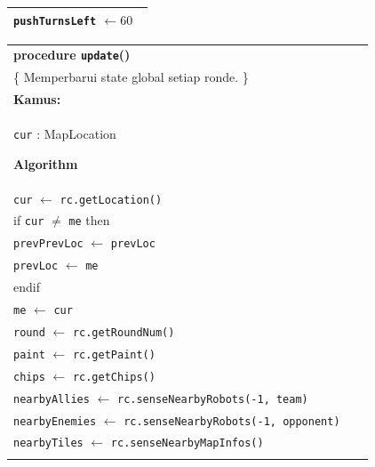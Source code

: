 \documentclass{article}
\newenvironment{pseudobox}
{
\centering
\begin{longtable}{|p{0.94\linewidth}|}
\hline
}
{
\\ \hline
\end{longtable}
\vspace{0.05cm}
}
\begin{document}
\begin{enumerate}[label=\alph*.]
\begin{enumerate}[label=\alph*.]
\begin{pseudobox}
\hspace*{1.5em}\texttt{pushTurnsLeft} $\leftarrow 60$
\end{pseudobox}

\begin{pseudobox}
\textbf{procedure \texttt{update}()} \\
\{ Memperbarui state global setiap ronde. \}\\

\textbf{Kamus:} \\
\hspace*{1.5em}\texttt{cur} : MapLocation

\textbf{Algorithm} \\
\hspace*{1.5em}\texttt{cur} $\leftarrow$ \texttt{rc.getLocation()} \\

\hspace*{1.5em}if \texttt{cur} $\neq$ \texttt{me} then \\
\hspace*{3em}\texttt{prevPrevLoc} $\leftarrow$ \texttt{prevLoc} \\
\hspace*{3em}\texttt{prevLoc} $\leftarrow$ \texttt{me} \\
\hspace*{1.5em}endif \\
\hspace*{1.5em}\texttt{me} $\leftarrow$ \texttt{cur} \\

\hspace*{1.5em}\texttt{round} $\leftarrow$ \texttt{rc.getRoundNum()} \\
\hspace*{1.5em}\texttt{paint} $\leftarrow$ \texttt{rc.getPaint()} \\
\hspace*{1.5em}\texttt{chips} $\leftarrow$ \texttt{rc.getChips()} \\

\hspace*{1.5em}\texttt{nearbyAllies} $\leftarrow$ \texttt{rc.senseNearbyRobots(-1, team)} \\
\hspace*{1.5em}\texttt{nearbyEnemies} $\leftarrow$ \texttt{rc.senseNearbyRobots(-1, opponent)} \\
\hspace*{1.5em}\texttt{nearbyTiles} $\leftarrow$ \texttt{rc.senseNearbyMapInfos()} \\


\end{pseudobox}
\end{enumerate}
\end{enumerate}
\end{document}
